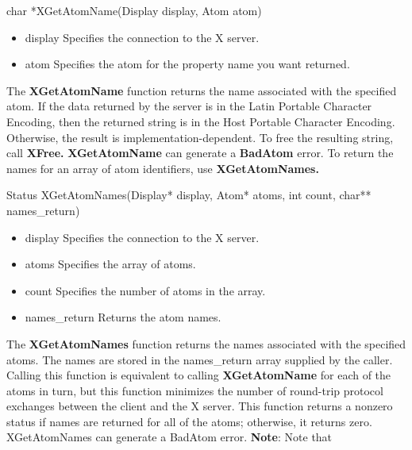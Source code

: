 \documentclass{report}
\begin{document}
\begin{itemize}
        \bigbreak \noindent 
        \begin{cppcode}
        char *XGetAtomName(Display display, Atom atom)
        \end{cppcode}
        \bigbreak \noindent
        \begin{itemize}
            \item display Specifies the connection to the X server.
            \item atom Specifies the atom for the property name you want returned.
        \end{itemize}
        The \textbf{XGetAtomName} function returns the name associated with the specified atom. If the data returned by the server is in the Latin Portable Character Encoding, then the returned string is in the Host Portable Character Encoding. Otherwise, the result is implementation-dependent. To free the resulting string, call \textbf{XFree.}
        \bigbreak \noindent 
        \textbf{XGetAtomName} can generate a \textbf{BadAtom} error.
        \bigbreak \noindent 
        To return the names for an array of atom identifiers, use \textbf{XGetAtomNames.}
        \bigbreak \noindent 
        \begin{cppcode}
            Status XGetAtomNames(Display* display, Atom* atoms, int count, char** names_return)
        \end{cppcode}
        \bigbreak \noindent
        \begin{itemize}
            \item display Specifies the connection to the X server.
            \item atoms Specifies the array of atoms.
            \item count Specifies the number of atoms in the array.
            \item names\_return Returns the atom names.
        \end{itemize}
        The \textbf{XGetAtomNames} function returns the names associated with the specified atoms. The names are stored in the names\_return array supplied by the caller. Calling this function is equivalent to calling \textbf{XGetAtomName} for each of the atoms in turn, but this function minimizes the number of round-trip protocol exchanges between the client and the X server. This function returns a nonzero status if names are returned for all of the atoms; otherwise, it returns zero.
        \bigbreak \noindent 
        XGetAtomNames can generate a BadAtom error.
        \bigbreak \noindent 
        \textbf{Note}: Note that 

\end{itemize}
\end{document}
